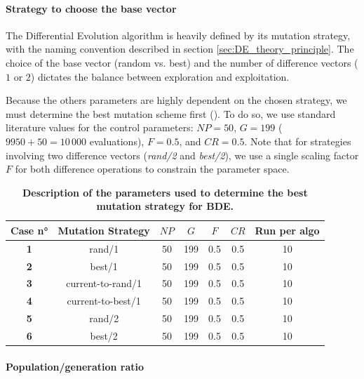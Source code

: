 \documentclass[12pt, openany]{article}
\begin{document}
\paragraph{Strategy to choose the base vector}
The Differential Evolution algorithm is heavily defined by its mutation strategy, with the naming convention described in section \ref{sec:DE_theory_principle}. The choice of the base vector (random vs. best) and the number of difference vectors ($1$ or $2$) dictates the balance between exploration and exploitation. 

Because the others parameters are highly dependent on the chosen strategy, we must determine the best mutation scheme first (). To do so, we use standard literature values for the control parameters: $NP=50$, $G=199$ ($9950+50 =10\,000$ evaluations), $F=0.5$, and $CR=0.5$. Note that for strategies involving two difference vectors (\textit{rand/2} and \textit{best/2}), we use a single scaling factor $F$ for both difference operations to constrain the parameter space.

\begin{table}[H]
    \centering
    \renewcommand{\arraystretch}{1.5}
    \begin{tabular}{|c|c|c|c|c|c|c|}
        \hline 
        \textbf{Case n°} & \textbf{Mutation Strategy} & $NP$ & $G$ & $F$ & $CR$ & \textbf{Run per algo} \\ \hline

        \textbf{1} & rand/1 & 50 & 199 & 0.5 & 0.5 & 10 \\ \hdashline
        \textbf{2} & best/1 & 50 & 199 & 0.5 & 0.5 & 10 \\ \hdashline
        \textbf{3} & current-to-rand/1 & 50 & 199 & 0.5 & 0.5 & 10 \\ \hdashline
        \textbf{4} & current-to-best/1 & 50 & 199 & 0.5 & 0.5 & 10 \\ \hdashline
        \textbf{5} & rand/2 & 50 & 199 & 0.5 & 0.5 & 10 \\ \hdashline
        \textbf{6} & best/2 & 50 & 199 & 0.5 & 0.5 & 10 \\ 
        \hline
    \end{tabular}
    \caption{\textbf{Description of the parameters used to determine the best mutation strategy for BDE.}}
    \label{tab:Cases_Determine_BDE_Strategy}
\end{table}

\paragraph{Population/generation ratio}
\end{document}
